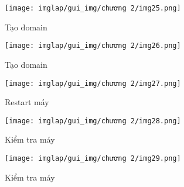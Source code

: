 \documentclass[13pt]{article}
\begin{document}
\begin{itemize}
\begin{itemize}
                            \begin{figure}[H]
                                \centering
                                \texttt{[image: imglap/gui\_img/chương 2/img25.png]}
                                \caption{Tạo domain}
                                \label{fig:enter-label}
                            \end{figure}

                            \begin{figure}[H]
                                \centering
                                \texttt{[image: imglap/gui\_img/chương 2/img26.png]}
                                \caption{Tạo domain}
                                \label{fig:enter-label}
                            \end{figure}

                            \begin{figure}[H]
                                \centering
                                \texttt{[image: imglap/gui\_img/chương 2/img27.png]}
                                \caption{Restart máy}
                                \label{fig:enter-label}
                            \end{figure}

                            \begin{figure}[H]
                                \centering
                                \texttt{[image: imglap/gui\_img/chương 2/img28.png]}
                                \caption{Kiểm tra máy}
                                \label{fig:enter-label}
                            \end{figure}

                            \begin{figure}[H]
                                \centering
                                \texttt{[image: imglap/gui\_img/chương 2/img29.png]}
                                \caption{Kiểm tra máy}
                                \label{fig:enter-label}
                            \end{figure}
                            
                        \end{itemize}
                \end{itemize}
                
            
\end{document}
